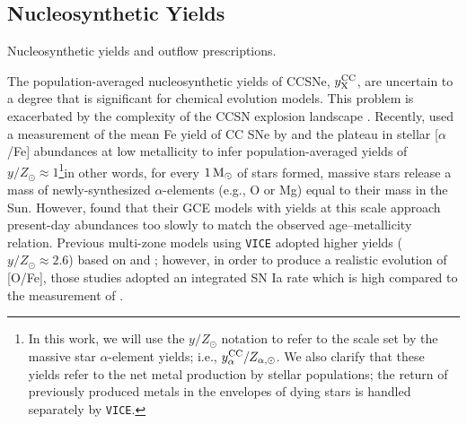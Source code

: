 \documentclass[twocolumn,twocolappendix,linenumbers]{aastex631}
\newcommand{\aFe}{[$\alpha$/Fe]\xspace}
\newcommand{\Msun}{\,{\rm M}_\odot}
\begin{document}
\subsection{Nucleosynthetic Yields}
\label{sec:yields}

\begin{table}
    \centering
    \caption{Nucleosynthetic yields and outflow prescriptions.}
    
    \label{tab:yields}
\end{table}

The population-averaged nucleosynthetic yields of CCSNe, $y_{\rm X}^{\rm CC}$, are uncertain to a degree that is significant for chemical evolution models. This problem is exacerbated by the complexity of the CCSN explosion landscape \citep{sukhbold_core-collapse_2016}. Recently, \citet{weinberg_scale_2024} used a measurement of the mean Fe yield of CC SNe by \citet{rodriguez_iron_2023} and the plateau in stellar \aFe abundances at low metallicity to infer population-averaged yields of $y/Z_\odot\approx1$\footnote{
    In this work, we will use the $y/Z_\odot$ notation to refer to the scale set by the massive star $\alpha$-element yields; i.e., $y_{\alpha}^{\rm CC}/Z_{\alpha,\odot}$. We also clarify that these yields refer to the net metal production by stellar populations; the return of previously produced metals in the envelopes of dying stars is handled separately by {\tt VICE}.
}\textemdash in other words, for every $1\Msun$ of stars formed, massive stars release a mass of newly-synthesized $\alpha$-elements (e.g., O or Mg) equal to their mass in the Sun. However, \citet{johnson_milky_2024} found that their GCE models with yields at this scale approach present-day abundances too slowly to match the observed age--metallicity relation. Previous multi-zone models using {\tt VICE} \citep[e.g.,][]{johnson_stellar_2021,dubay_galactic_2024} adopted higher yields ($y/Z_\odot\approx2.6$) based on \citet{chieffi_explosive_2004} and \citet{limongi_nucleosynthesis_2006}; however, in order to produce a realistic evolution of [O/Fe], those studies adopted an integrated SN Ia rate which is high compared to the measurement of \citet{maoz_star_2017}.
\end{document}
